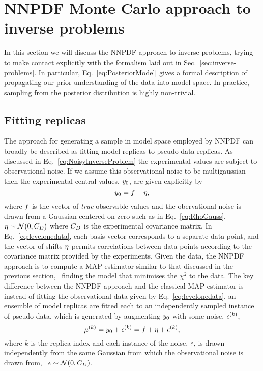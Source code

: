\section{NNPDF Monte Carlo approach to inverse problems}
\label{sec:closure-test}

In this section we will discuss the NNPDF approach to inverse problems, trying
to make contact explicitly with the formalism laid out in
Sec.~\ref{sec:inverse-problems}. In particular, Eq.~\eqref{eq:PosteriorModel}
gives a formal description of propagating our prior understanding of the data
into model space. In practice, sampling from the posterior distribution is
highly non-trivial.

\subsection{Fitting replicas}
\label{sec:fit-reps}

The approach for generating a sample in model space employed by NNPDF can
broadly be described as fitting model replicas to pseudo-data replicas. As
discussed in Eq.~\eqref{eq:NoisyInverseProblem} the experimental values are
subject to observational noise. If we assume this observational noise to be
multigaussian then the experimental central values, $y_0$, are given
explicitly by
\begin{equation}
    \label{eq:levelonedata}
    y_0 = f + \eta,
\end{equation}
where $f$ is the vector of {\em true} observable values and the obervational
noise is drawn from a Gaussian centered on zero such as in
Eq.~\ref{eq:RhoGauss}, \ie\ $\eta \sim \mathcal{N}(0, C_{D})$ where
$C_{D}$ is the experimental covariance matrix. In
Eq.~\eqref{eq:levelonedata}, each basis vector corresponds to a separate data
point, and the vector of shifts $\eta$ permits correlations between data
points according to the covariance matrix provided by the experiments. Given the
data, the NNPDF approach is to compute a MAP estimator similar to that discussed
in the previous section, \ie\ finding the model that minimises the $\chi^2$ to
the data. The key difference between the NNPDF approach and the classical MAP
estimator is instead of fitting the observational data given by
Eq.~\ref{eq:levelonedata}, an ensemble of model replicas are fitted each to an
independently sampled instance of pseudo-data, which is generated by augmenting
$y_0$ with some noise, $\epsilon^{(k)}$,
\begin{equation}
    \label{eq:leveltwodata1}
    \mu^{(k)} = y_0 + \epsilon^{(k)}
    = f + \eta + \epsilon^{(k)},
\end{equation}
where $k$ is the replica index and each instance of the noise, $\epsilon$, is drawn
independently from the same Gaussian from which the observational noise is
drawn from, \ie\ $\epsilon \sim \mathcal{N}(0, C_{D})$.

